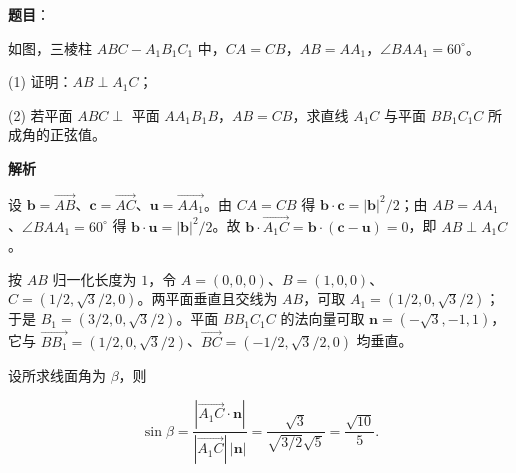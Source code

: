 \begin{answer}

\textbf{题目}：

如图，三棱柱 $ABC-A_1B_1C_1$ 中，$CA=CB$，$AB=AA_1$，$\angle BAA_1=60^\circ$。
\nopagebreak[4]
\begin{center}\end{center}
\nopagebreak[4]
(1) 证明：$AB\perp A_1C$；

(2) 若平面 $ABC\perp$ 平面 $AA_1B_1B$，$AB=CB$，求直线 $A_1C$ 与平面 $BB_1C_1C$ 所成角的正弦值。

\textbf{解析}


设 $\boldsymbol b=\overrightarrow{AB}$、$\boldsymbol c=\overrightarrow{AC}$、$\boldsymbol u=\overrightarrow{AA_1}$。由 $CA=CB$ 得 $\boldsymbol b\cdot\boldsymbol c=|\boldsymbol b|^2/2$；由 $AB=AA_1$、$\angle BAA_1=60^\circ$ 得 $\boldsymbol b\cdot\boldsymbol u=|\boldsymbol b|^2/2$。故 $\boldsymbol b\cdot\overrightarrow{A_1C}=\boldsymbol b\cdot(\boldsymbol c-\boldsymbol u)=0$，即 $AB\perp A_1C$。


按 $AB$ 归一化长度为 $1$，令 $A=(0,0,0)$、$B=(1,0,0)$、$C=(1/2,\sqrt3/2,0)$。两平面垂直且交线为 $AB$，可取 $A_1=(1/2,0,\sqrt3/2)$；于是 $B_1=(3/2,0,\sqrt3/2)$。平面 $BB_1C_1C$ 的法向量可取 $\boldsymbol n=(-\sqrt3,-1,1)$，它与 $\overrightarrow{BB_1}=(1/2,0,\sqrt3/2)$、$\overrightarrow{BC}=(-1/2,\sqrt3/2,0)$ 均垂直。

设所求线面角为 $\beta$，则

\nopagebreak[4]
\[
\sin\beta=\frac{|\overrightarrow{A_1C}\cdot\boldsymbol n|}
{|\overrightarrow{A_1C}|\,|\boldsymbol n|}
=\frac{\sqrt3}{\sqrt{3/2}\sqrt5}=\frac{\sqrt{10}}5.
\]



\end{answer}
